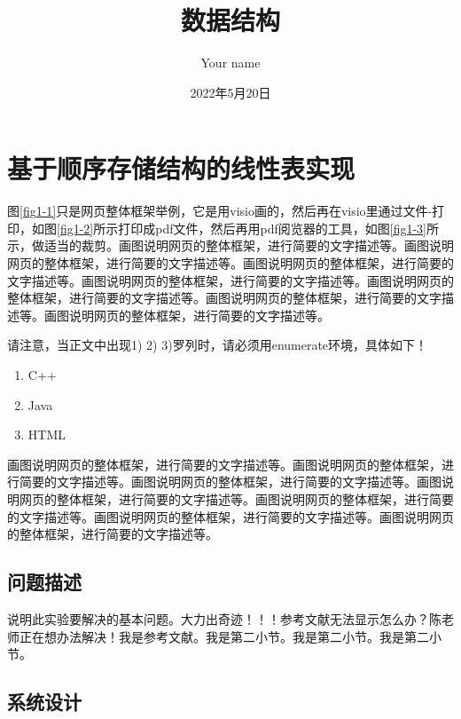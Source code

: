 \documentclass[supercite]{HustGraduPaper}
\title{~~~~~~数据结构~~~~~~}
\author{Your name}
\date{2022年5月20日}
\theoremstyle{definition}
\begin{document}
    \maketitle[logo color=black]
    \clearpage %
    \tableofcontents


    \section{基于顺序存储结构的线性表实现}

    图\ref{fig1-1}只是网页整体框架举例，它是用visio画的，然后再在visio里通过文件-打印，如图\ref{fig1-2}所示打印成pdf文件，然后再用pdf阅览器的工具，如图\ref{fig1-3}所示，做适当的裁剪。画图说明网页的整体框架，进行简要的文字描述等。画图说明网页的整体框架，进行简要的文字描述等。画图说明网页的整体框架，进行简要的文字描述等。画图说明网页的整体框架，进行简要的文字描述等。画图说明网页的整体框架，进行简要的文字描述等。画图说明网页的整体框架，进行简要的文字描述等。画图说明网页的整体框架，进行简要的文字描述等。

    请注意，当正文中出现1) 2) 3)罗列时，请必须用enumerate环境，具体如下！

    \begin{enumerate}
        \renewcommand{\labelenumi}{\theenumi)}
        \item C++
        \item Java
        \item HTML
    \end{enumerate}

    画图说明网页的整体框架，进行简要的文字描述等。画图说明网页的整体框架，进行简要的文字描述等。画图说明网页的整体框架，进行简要的文字描述等。画图说明网页的整体框架，进行简要的文字描述等。画图说明网页的整体框架，进行简要的文字描述等。画图说明网页的整体框架，进行简要的文字描述等。画图说明网页的整体框架，进行简要的文字描述等。

    \subsection{问题描述}

    说明此实验要解决的基本问题。大力出奇迹！！！参考文献无法显示怎么办？陈老师正在想办法解决\cite{STR2021Neurocom, AVS2021Neurocom}！我是参考文献。我是第二小节\cite{Mehrabian1974An}。我是第二小节\cite{Rezaei2014CVPR}。我是第二小节\cite{Ramnath2008IJCV}。

    \subsection{系统设计}
\end{document}
